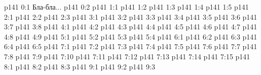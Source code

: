 \author{Промежуточные создания}
\vs p141 0:1  Бла-бла...
\vs p141 0:2 
\vs p141 1:1 
\vs p141 1:2 
\vs p141 1:3 
\vs p141 1:4 
\vs p141 1:5 
\vs p141 2:1 
\vs p141 2:2 
\vs p141 2:3 
\vs p141 3:1 
\vs p141 3:2 
\vs p141 3:3 
\vs p141 3:4 \pc 
\vs p141 3:5 
\vs p141 3:6 
\vs p141 3:7 
\vs p141 3:8 
\vs p141 4:1 
\vs p141 4:2 
\vs p141 4:3 
\vs p141 4:4 \pc 
\vs p141 4:5 
\vs p141 4:6 
\vs p141 4:7 
\vs p141 4:8 \pc 
\vs p141 4:9 
\vs p141 5:1 
\vs p141 5:2 
\vs p141 5:3 
\vs p141 5:4 
\vs p141 6:1 
\vs p141 6:2 
\vs p141 6:3 
\vs p141 6:4 \pc 
\vs p141 6:5 
\vs p141 7:1 
\vs p141 7:2 
\vs p141 7:3 \pc 
\vs p141 7:4 
\vs p141 7:5 
\vs p141 7:6 
\vs p141 7:7 
\vs p141 7:8 
\vs p141 7:9 
\vs p141 7:10 
\vs p141 7:11 
\vs p141 7:12 
\vs p141 7:13 
\vs p141 7:14 
\vs p141 7:15 
\vs p141 8:1 
\vs p141 8:2 
\vs p141 8:3 
\vs p141 9:1 
\vs p141 9:2 
\vs p141 9:3 
\quizlink
